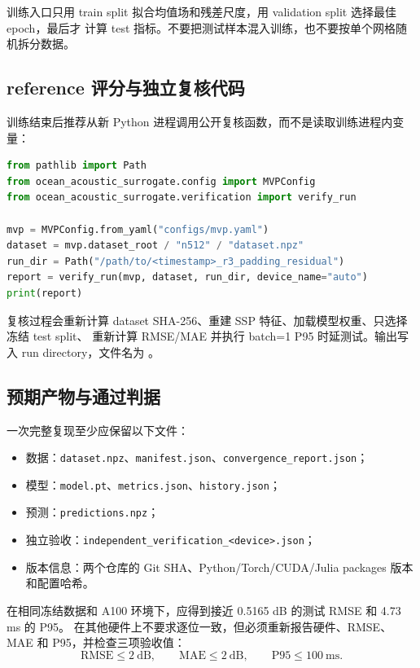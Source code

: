 \documentclass[UTF8,11pt]{ctexart}
\newcommand{\RMSE}{\mathrm{RMSE}}
\begin{document}
训练入口只用 train split 拟合均值场和残差尺度，用 validation split 选择最佳 epoch，最后才
计算 test 指标。不要把测试样本混入训练，也不要按单个网格随机拆分数据。

\subsection{reference 评分与独立复核代码}

训练结束后推荐从新 Python 进程调用公开复核函数，而不是读取训练进程内变量：

\begin{lstlisting}[style=repro,language=Python]
from pathlib import Path
from ocean_acoustic_surrogate.config import MVPConfig
from ocean_acoustic_surrogate.verification import verify_run

mvp = MVPConfig.from_yaml("configs/mvp.yaml")
dataset = mvp.dataset_root / "n512" / "dataset.npz"
run_dir = Path("/path/to/<timestamp>_r3_padding_residual")
report = verify_run(mvp, dataset, run_dir, device_name="auto")
print(report)
\end{lstlisting}

复核过程会重新计算 dataset SHA-256、重建 SSP 特征、加载模型权重、只选择冻结 test split、
重新计算 RMSE/MAE 并执行 batch=1 P95 时延测试。输出写入 run directory，文件名为
。

\subsection{预期产物与通过判据}

一次完整复现至少应保留以下文件：
\begin{itemize}
  \item 数据：\texttt{dataset.npz}、\texttt{manifest.json}、\texttt{convergence\_report.json}；
  \item 模型：\texttt{model.pt}、\texttt{metrics.json}、\texttt{history.json}；
  \item 预测：\texttt{predictions.npz}；
  \item 独立验收：\texttt{independent\_verification\_<device>.json}；
  \item 版本信息：两个仓库的 Git SHA、Python/Torch/CUDA/Julia packages 版本和配置哈希。
\end{itemize}

在相同冻结数据和 A100 环境下，应得到接近 0.5165 dB 的测试 RMSE 和 4.73 ms 的 P95。
在其他硬件上不要求逐位一致，但必须重新报告硬件、RMSE、MAE 和 P95，并检查三项验收值：
\begin{equation}
  \RMSE\leq2\ \mathrm{dB},\qquad
  \mathrm{MAE}\leq2\ \mathrm{dB},\qquad
  \mathrm{P95}\leq100\ \mathrm{ms}.
\end{equation}
\end{document}
